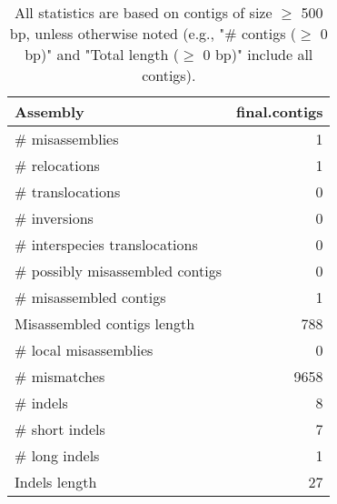 \documentclass[12pt,a4paper]{article}
\begin{document}
\begin{table}[ht]
\begin{center}
\caption{All statistics are based on contigs of size $\geq$ 500 bp, unless otherwise noted (e.g., "\# contigs ($\geq$ 0 bp)" and "Total length ($\geq$ 0 bp)" include all contigs).}
\begin{tabular}{|l*{1}{|r}|}
\hline
Assembly & final.contigs \\ \hline
\# misassemblies & 1 \\ \hline
\hspace{5mm}\# relocations & 1 \\ \hline
\hspace{5mm}\# translocations & 0 \\ \hline
\hspace{5mm}\# inversions & 0 \\ \hline
\hspace{5mm}\# interspecies translocations & 0 \\ \hline
\# possibly misassembled contigs & 0 \\ \hline
\# misassembled contigs & 1 \\ \hline
Misassembled contigs length & 788 \\ \hline
\# local misassemblies & 0 \\ \hline
\# mismatches & 9658 \\ \hline
\# indels & 8 \\ \hline
\hspace{5mm}\# short indels & 7 \\ \hline
\hspace{5mm}\# long indels & 1 \\ \hline
Indels length & 27 \\ \hline
\end{tabular}
\end{center}
\end{table}
\end{document}
